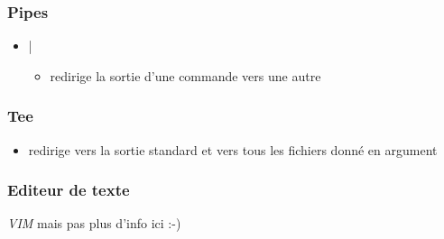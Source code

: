 \documentclass[a4paper]{article}
\begin{document}
    \subsubsection{Pipes}
    \begin{itemize}[label=\textbullet, font=\Large]
      \item |
      \begin{itemize}[label=, font=\scriptsize]
        \item redirige la sortie d'une commande vers une autre
      \end{itemize}
    \end{itemize}

    \subsubsection{Tee}
    \begin{itemize}
      \item redirige vers la sortie standard et vers tous les fichiers donné en argument
    \end{itemize}

    \subsubsection{Editeur de texte}
    \emph{VIM} mais pas plus d'info ici :-)
\end{document}
